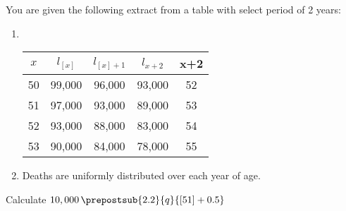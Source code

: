 You are given the following extract from a table with select period of 2 years:
\begin{enumerate}
\item \ \begin{center}\begin{tabular}{ccccc}
      $ x$  &   $l_{[x]}$ &   $l_{[x]+1}$ &   $l_{x+2}$   & x+2 \\ \hline
        50 & 99,000 & 96,000 & 93,000 & 52  \\
        51 & 97,000 & 93,000 & 89,000 & 53  \\
        52 & 93,000 & 88,000 & 83,000 & 54  \\
        53 & 90,000 & 84,000 & 78,000 & 55  
   \end{tabular}\end{center}
\medskip
\item Deaths are uniformly distributed over each year of age.
\end{enumerate}
Calculate $10,000\, \prepostsub{2.2}{q}{[51]+0.5}$
  


